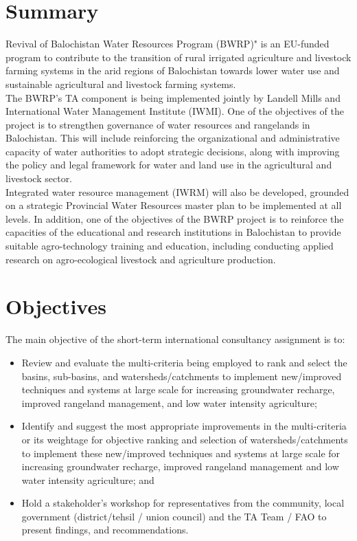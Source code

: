 \section*{Summary}
Revival of Balochistan Water Resources Program (BWRP)" is an EU-funded program to contribute to the transition of rural irrigated agriculture and livestock farming systems in the arid regions of Balochistan towards lower water use and sustainable agricultural and livestock farming systems.
\\

The BWRP's TA component is being implemented jointly by Landell Mills and International Water Management Institute (IWMI). One of the objectives of the project is to strengthen governance of water resources and rangelands in Balochistan. This will include reinforcing the organizational and administrative capacity of water authorities to adopt strategic decisions, along with improving the policy and legal framework for water and land use in the agricultural and livestock sector.
\\

Integrated water resource management (IWRM) will also be developed, grounded on a strategic Provincial Water Resources master plan to be implemented at all levels.
In addition, one of the objectives of the BWRP project is to reinforce the capacities of the educational and research institutions in Balochistan to provide suitable agro-technology training and education, including conducting applied research on agro-ecological livestock and agriculture production.

\section*{Objectives}
The main objective of the short-term international consultancy assignment is to:
\begin{itemize}
    \item Review and evaluate the multi-criteria being employed to rank and select the basins, sub-basins, and watersheds/catchments to implement new/improved techniques and systems at large scale for increasing groundwater recharge, improved rangeland management, and low water intensity agriculture;
    \item Identify and suggest the most appropriate improvements in the multi-criteria or its weightage for objective ranking and selection of watersheds/catchments to implement these new/improved techniques and systems at large scale for increasing groundwater recharge, improved rangeland management and low water intensity agriculture; and
    \item Hold a stakeholder’s workshop for representatives from the community, local government (district/tehsil / union council) and the TA Team / FAO to present findings, and recommendations.
\end{itemize}


